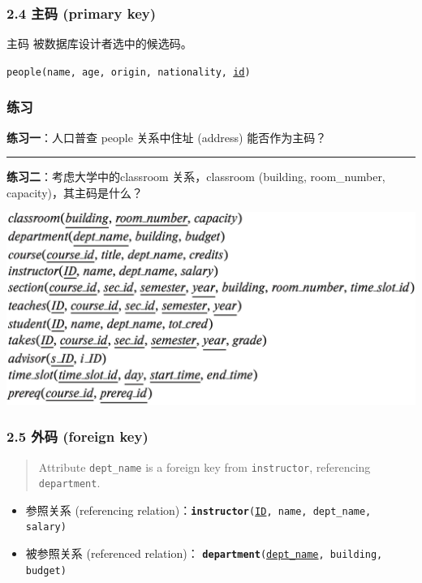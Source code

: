 \documentclass[aspectratio=169, 14pt]{beamer}
\begin{document}
\begin{frame}
	\frametitle{2.4 主码 (primary key)}
	\begin{exampleblock}{主码}
		被数据库设计者选中的候选码。
	\end{exampleblock}

	\texttt{people(name, age, origin, nationality, \underline{id})}

\end{frame}

\begin{frame}
	\frametitle{练习 {\large {}}}
	\textbf{练习一}：人口普查 people 关系中住址 (address) 能否作为主码？
	\noindent\rule{\textwidth}{1pt}
	\textbf{练习二}：考虑大学中的classroom 关系，classroom (building, room\_number, capacity)，其主码是什么？
\end{frame}

\begin{frame}
	\begin{center}
		\includegraphics[height=.75\paperheight]{table/schema}
	\end{center}

\end{frame}

\begin{frame}
	\frametitle{2.5 外码 (foreign key)}

	\begin{quote}
		Attribute \texttt{dept\_name} is a \alert{foreign key} from \texttt{instructor}, referencing \texttt{department}.
	\end{quote}


	\begin{itemize}
		\item \alert{参照关系} (referencing relation)：\texttt{\textbf{instructor}(\underline{ID}, name, dept\_name, salary)}
		\item  \alert{被参照关系} (referenced relation)：
		      \texttt{\textbf{department}(\underline{dept\_name}, building, budget)}
	\end{itemize}

\end{frame}
\end{document}

